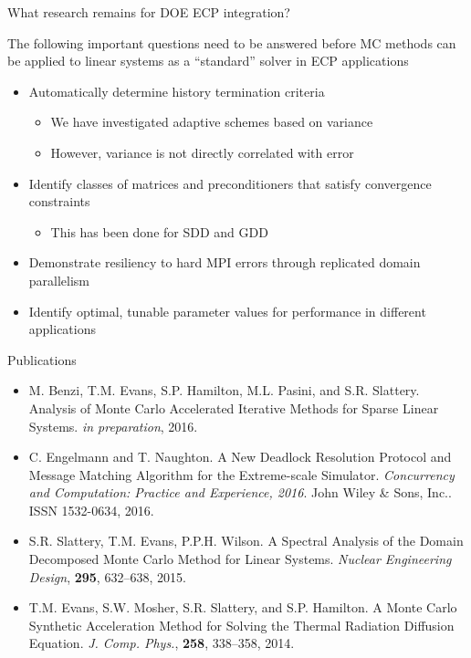 \documentclass{beamer}
\begin{document}
\begin{frame}{What research remains for DOE ECP integration?}

  The following important questions need to be answered before MC methods can
  be applied to linear systems as a ``standard'' solver in ECP applications

  \begin{itemize}
  \item Automatically determine history termination criteria
    \begin{itemize}
    \item We have investigated adaptive schemes based on variance
    \item However, variance is not directly correlated with error
    \end{itemize}
  \item Identify classes of matrices and preconditioners that satisfy
    convergence constraints
    \begin{itemize}
    \item This has been done for SDD and GDD
    \end{itemize}
  \item Demonstrate resiliency to hard MPI errors through replicated domain
    parallelism
  \item Identify optimal, tunable parameter values for performance in
    different applications
  \end{itemize}
\end{frame}


\begin{frame}{Publications}

  \begin{itemize}
  \item M. Benzi, T.M. Evans, S.P. Hamilton, M.L. Pasini, and
    S.R. Slattery. Analysis of Monte Carlo Accelerated Iterative Methods for
    Sparse Linear Systems. \textit{in preparation}, 2016.
  \item C. Engelmann and T. Naughton. A New Deadlock Resolution Protocol and
    Message Matching Algorithm for the Extreme-scale
    Simulator. \textit{Concurrency and Computation: Practice and Experience,
      2016}. John Wiley \& Sons, Inc.. ISSN 1532-0634, 2016.
  \item S.R. Slattery, T.M. Evans, P.P.H. Wilson. A Spectral Analysis of the
    Domain Decomposed Monte Carlo Method for Linear Systems. \textit{Nuclear
      Engineering Design},  {\bf 295}, 632--638, 2015.
  \item T.M. Evans, S.W. Mosher, S.R. Slattery, and S.P. Hamilton. A Monte Carlo
    Synthetic Acceleration Method for Solving the Thermal Radiation Diffusion
    Equation. \textit{J. Comp. Phys.}, {\bf 258}, 338--358, 2014.
  \end{itemize}

\end{frame}
\end{document}
